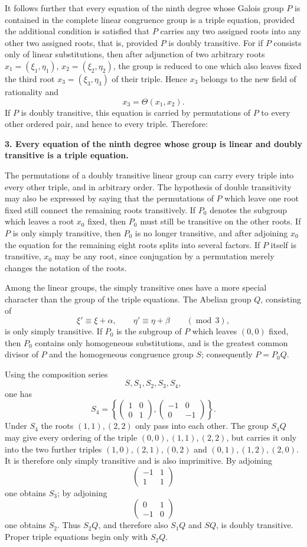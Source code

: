 \documentclass[11pt]{article}
\providecommand{\mat}[4]{\begin{pmatrix}#1&#2\\#3&#4\end{pmatrix}}
\providecommand{\mat}[4]{\begin{pmatrix}#1&#2\\#3&#4\end{pmatrix}}
\providecommand{\mat}[1]{\begin{pmatrix}#1\end{pmatrix}}
\begin{document}
It follows further that every equation of the ninth degree whose Galois group \(P\) is contained in the complete linear congruence group is a triple equation, provided the additional condition is satisfied that \(P\) carries any two assigned roots into any other two assigned roots, that is, provided \(P\) is doubly transitive. For if \(P\) consists only of linear substitutions, then after adjunction of two arbitrary roots \(x_1=(\xi_1,\eta_1)\), \(x_2=(\xi_2,\eta_2)\), the group is reduced to one which also leaves fixed the third root \(x_3=(\xi_3,\eta_3)\) of their triple. Hence \(x_3\) belongs to the new field of rationality and
\begin{equation}
 x_3=\Theta(x_1,x_2).
 \tag{8}
\end{equation}
If \(P\) is doubly transitive, this equation is carried by permutations of \(P\) to every other ordered pair, and hence to every triple. Therefore:

\textbf{3. Every equation of the ninth degree whose group is linear and doubly transitive is a triple equation.}

The permutations of a doubly transitive linear group can carry every triple into every other triple, and in arbitrary order. The hypothesis of double transitivity may also be expressed by saying that the permutations of \(P\) which leave one root fixed still connect the remaining roots transitively. If \(P_0\) denotes the subgroup which leaves a root \(x_0\) fixed, then \(P_0\) must still be transitive on the other roots. If \(P\) is only simply transitive, then \(P_0\) is no longer transitive, and after adjoining \(x_0\) the equation for the remaining eight roots splits into several factors. If \(P\) itself is transitive, \(x_0\) may be any root, since conjugation by a permutation merely changes the notation of the roots.

Among the linear groups, the simply transitive ones have a more special character than the group of the triple equations. The Abelian group \(Q\), consisting of
\begin{equation}
 \xi'\equiv \xi+\alpha,
 \qquad
 \eta'\equiv \eta+\beta
 \qquad(\operatorname{mod}\,3),
 \tag{9}
\end{equation}
is only simply transitive. If \(P_0\) is the subgroup of \(P\) which leaves \((0,0)\) fixed, then \(P_0\) contains only homogeneous substitutions, and is the greatest common divisor of \(P\) and the homogeneous congruence group \(S\); consequently \(P=P_0Q\).

Using the composition series
\[
 S,
 S_1,
 S_2,
 S_3,
 S_4,
\]
one has
\[
 S_4=\left\{
 \mat{1}{0}{0}{1},
 \mat{-1}{0}{0}{-1}
 \right\}.
\]
Under \(S_4\) the roots \((1,1),(2,2)\) only pass into each other. The group \(S_4Q\) may give every ordering of the triple \((0,0),(1,1),(2,2)\), but carries it only into the two further triples \((1,0),(2,1),(0,2)\) and \((0,1),(1,2),(2,0)\). It is therefore only simply transitive and is also imprimitive. By adjoining
\[
 \mat{-1}{1}{1}{1}
\]
one obtains \(S_3\); by adjoining
\[
 \mat{0}{1}{-1}{0}
\]
one obtains \(S_2\). Thus \(S_2Q\), and therefore also \(S_1Q\) and \(SQ\), is doubly transitive. Proper triple equations begin only with \(S_2Q\).
\end{document}
